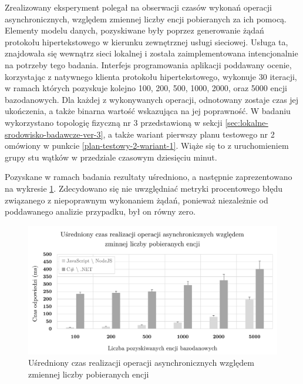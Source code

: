 Zrealizowany eksperyment polegał na obserwacji czasów wykonań operacji asynchronicznych, względem zmiennej liczby encji pobieranych za ich pomocą. Elementy modelu danych, pozyskiwane były poprzez generowanie żądań protokołu hipertekstowego w kierunku zewnętrznej usługi sieciowej. Usługa ta, znajdowała się wewnątrz sieci lokalnej i została zaimplementowana intencjonalnie na potrzeby tego badania. Interfejs programowania aplikacji poddawany ocenie, korzystając z natywnego klienta protokołu hipertekstowego, wykonuje 30 iteracji, w ramach których pozyskuje kolejno 100, 200, 500, 1000, 2000, oraz 5000 encji bazodanowych. Dla każdej z wykonywanych operacji, odnotowany zostaje czas jej ukończenia, a także binarna wartość wskazująca na jej poprawność. W badaniu wykorzystano topologię fizyczną nr 3 przedstawioną w sekcji \ref{sec:lokalne-srodowisko-badawcze-ver-3}, a także wariant pierwszy planu testowego nr 2 omówiony w punkcie \ref{plan-testowy-2-wariant-1}. Wiąże się to z uruchomieniem grupy stu wątków w przedziale czasowym dziesięciu minut.

Pozyskane w ramach badania rezultaty uśredniono, a następnie zaprezentowano na wykresie \ref{fig:async-times}. Zdecydowano się nie uwzględniać metryki procentowego błędu związanego z niepoprawnym wykonaniem żądań, ponieważ niezależnie od poddawanego analizie przypadku, był on równy zero.

\begin{figure}[H]
  \centering
   \includegraphics[width=\linewidth]{rys05/async-times.pdf}
  \caption{Uśredniony czas realizacji operacji asynchronicznych względem zmiennej liczby pobieranych encji}
  \label{fig:async-times}
\end{figure}

